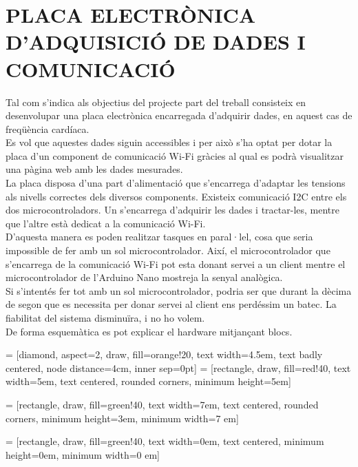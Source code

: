 \chapter{\uppercase{Placa electrònica d'adquisició de dades i comunicació}}
Tal com s'indica als objectius del projecte part del treball consisteix en desenvolupar una placa electrònica encarregada d'adquirir dades, en aquest cas de freqüència cardíaca. \\
\newline Es vol que aquestes dades siguin accessibles i per això s'ha optat per dotar la placa d'un component de comunicació Wi-Fi gràcies al qual es podrà visualitzar una pàgina web amb les dades mesurades.\\
\newline La placa disposa d'una part d'alimentació que s'encarrega d'adaptar les tensions als nivells correctes dels diversos components. Existeix comunicació I2C entre els dos microcontroladors. Un s'encarrega d'adquirir les dades i tractar-les, mentre que l'altre està dedicat a la comunicació Wi-Fi.\\
\newline D'aquesta manera es poden realitzar tasques en paral·lel, cosa que seria impossible de fer amb un sol microcontrolador. Així, el microcontrolador que s'encarrega de la comunicació Wi-Fi pot esta donant servei a un client mentre el microcontrolador de l'Arduino Nano mostreja la senyal analògica.\\
\newline Si s'intentés fer tot amb un sol microcontrolador, podria ser que durant la dècima de segon que es necessita per donar servei al client ens perdéssim un batec. La fiabilitat del sistema disminuïra, i no ho volem.\\
\newline De forma esquemàtica es pot explicar el hardware mitjançant blocs.

 = [diamond, aspect=2, draw, fill=orange!20, 
    text width=4.5em, text badly centered, node distance=4cm, inner sep=0pt]
 = [rectangle, draw, fill=red!40, 
    text width=5em, text centered, rounded corners, minimum height=5em]
    
 = [rectangle, draw, fill=green!40, 
    text width=7em, text centered, rounded corners, minimum height=3em, minimum width=7 em]
    
 = [rectangle, draw, fill=green!40, 
    text width=0em, text centered,  minimum height=0em, minimum width=0 em]
    

